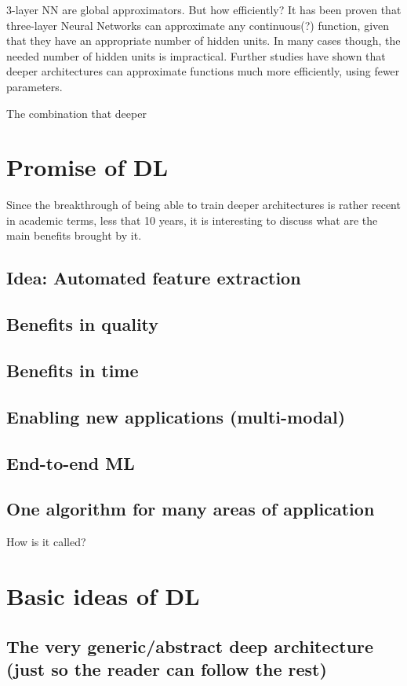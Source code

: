 \documentclass[a4paper]{report}
\begin{document}
		3-layer NN are global approximators. But how efficiently?
		It has been proven  that three-layer Neural Networks can approximate any continuous(?)  function, given that they have an appropriate number of hidden units.
		In many cases though, the needed number of hidden units  is impractical. Further studies have shown that deeper architectures can approximate functions much more efficiently, using fewer parameters.
		
		The combination that deeper 
		
\section{Promise of DL}
	Since the breakthrough of being able to train deeper architectures is rather recent in academic terms, less that 10 years, it is interesting to discuss what are the main benefits brought by it.
	\subsection{Idea: Automated feature extraction}
	\subsection{Benefits in quality}
	\subsection{Benefits in time}
	\subsection{Enabling new applications (multi-modal)}
	\subsection{End-to-end ML}
	\subsection{One algorithm for many areas of application}
	How is it called?
\section{Basic ideas of DL}
	\subsection{The very generic/abstract deep architecture (just so the reader can follow the rest)}
\end{document}
